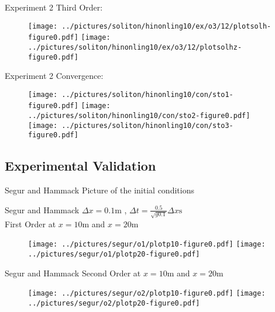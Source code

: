\documentclass[pdf]{beamer}
\begin{document}
\begin{frame}{Experiment 2}
Third Order:

\begin{figure}
\texttt{[image: ../pictures/soliton/hinonling10/ex/o3/12/plotsolh-figure0.pdf]}
\texttt{[image: ../pictures/soliton/hinonling10/ex/o3/12/plotsolhz-figure0.pdf]}
\end{figure}
\end{frame}

\begin{frame}{Experiment 2}
Convergence:

\begin{figure}
\texttt{[image: ../pictures/soliton/hinonling10/con/sto1-figure0.pdf]}
\texttt{[image: ../pictures/soliton/hinonling10/con/sto2-figure0.pdf]}
\texttt{[image: ../pictures/soliton/hinonling10/con/sto3-figure0.pdf]}
\end{figure}
\end{frame}


\subsection{Experimental Validation}

\begin{frame}{Segur and Hammack}
Picture of the initial conditions
\end{frame}

\begin{frame}{Segur and Hammack}
$\Delta x = 0.1 \text{m}$ , $\Delta t = \frac{0.5}{\sqrt{g 0.1}} \Delta x \text{s}$ \\

First Order at $x = 10\text{m}$ and $x = 20 \text{m}$
\begin{figure}
\texttt{[image: ../pictures/segur/o1/plotp10-figure0.pdf]}
\texttt{[image: ../pictures/segur/o1/plotp20-figure0.pdf]}
\end{figure}
\end{frame}

\begin{frame}{Segur and Hammack}
Second Order at $x = 10\text{m}$ and $x = 20 \text{m}$
\begin{figure}
\texttt{[image: ../pictures/segur/o2/plotp10-figure0.pdf]}
\texttt{[image: ../pictures/segur/o2/plotp20-figure0.pdf]}
\end{figure}
\end{frame}
\end{document}
